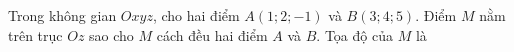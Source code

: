 \begin{ex}
Trong không gian $Oxyz$, cho hai điểm $A(1;2;-1)$ và $B(3;4;5)$. Điểm $M$ nằm trên trục $Oz$ sao cho $M$ cách đều hai điểm $A$ và $B$. Tọa độ của $M$ là
\end{ex}
